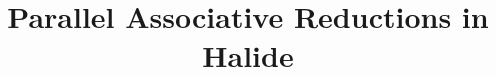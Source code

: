 \documentclass{main}
\begin{document}


\title{Parallel Associative Reductions in Halide}

\end{document}
